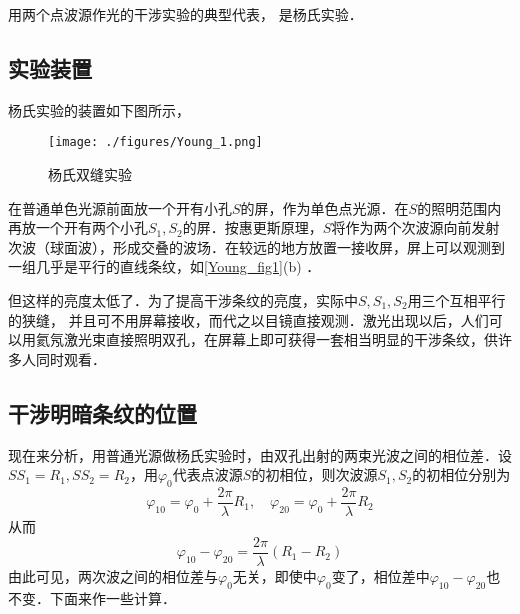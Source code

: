 

用两个点波源作光的干涉实验的典型代表， 是杨氏实验．
\subsection{实验装置}
杨氏实验的装置如下图所示，
\begin{figure}[ht]
\centering
\texttt{[image: ./figures/Young\_1.png]}
\caption{杨氏双缝实验} \label{Young_fig1}
\end{figure}
在普通单色光源前面放一个开有小孔$S$的屏，作为单色点光源．在$S $的照明范围内再放一个开有两个小孔$S_1,S_2$的屏．按惠更斯原理，$S$将作为两个次波源向前发射次波（球面波），形成交叠的波场．在较远的地方放置一接收屏，屏上可以观测到一组几乎是平行的直线条纹，如\autoref{Young_fig1}(b) ．

但这样的亮度太低了．为了提高干涉条纹的亮度，实际中$S,S_1,S_2$用三个互相平行的狭缝，%
并且可不用屏幕接收，而代之以目镜直接观测．激光出现以后，人们可以用氦氖激光束直接照明双孔，在屏幕上即可获得一套相当明显的干涉条纹，供许多人同时观看．

\subsection{干涉明暗条纹的位置}
现在来分析，用普通光源做杨氏实验时，由双孔出射的两束光波之间的相位差．设$SS_1=R_1,SS_2=R_2$，用$\varphi_0$代表点波源$S$的初相位，则次波源$S_1,S_2$的初相位分别为
\begin{equation}
\varphi_{10}=\varphi_{0}+\frac{2 \pi}{\lambda} R_{1}, \quad \varphi_{20}=\varphi_{0}+\frac{2 \pi}{\lambda} R_{2}
\end{equation}
从而
\begin{equation}
\varphi_{10}-\varphi_{20}=\frac{2 \pi}{\lambda}\left(R_{1}-R_{2}\right)
\end{equation}
由此可见，两次波之间的相位差与$\varphi_0$无关，即使中$\varphi_0$变了，相位差中$\varphi_{10}-\varphi_{20}$也不变．下面来作一些计算．

